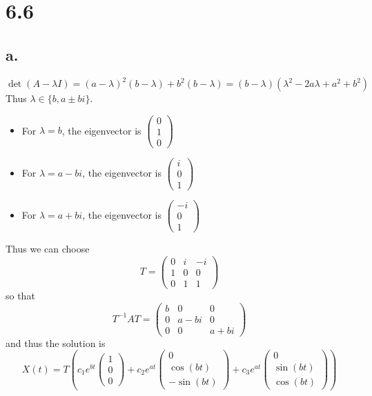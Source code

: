 \documentclass[11pt]{article}
\theoremstyle{mystyle}
\theoremstyle{definition}
\begin{document}
\section*{6.6}
\subsection*{a.}
\[
  \det(A-\lambda I) = (a-\lambda)^2(b-\lambda) + b^2(b-\lambda) = (b-\lambda)(\lambda^2 - 2a\lambda + a^2 + b^2)
\]
Thus $\lambda \in \{b, a \pm bi\}$. \\
\begin{itemize}
  \item For $\lambda = b$, the eigenvector is
    $  
    \begin{pmatrix}
      0 \\ 1 \\ 0 
    \end{pmatrix}
    $ 
  \item For $\lambda = a-bi$, the eigenvector is
    $  
    \begin{pmatrix}
      i \\ 0 \\ 1 
    \end{pmatrix}
    $
  \item For $\lambda = a+bi$, the eigenvector is
    $  
    \begin{pmatrix}
      -i \\ 0 \\ 1 
    \end{pmatrix}
    $
\end{itemize}
Thus we can choose 
\[
  T = 
  \begin{pmatrix}
    0 & i & -i \\
    1 & 0 & 0 \\
    0 & 1 & 1
  \end{pmatrix}
\]
so that 
\[
  T^{-1}AT = 
  \begin{pmatrix}
    b & 0 & 0 \\
    0 & a-bi & 0 \\
    0 & 0 & a+bi
  \end{pmatrix}
\]
and thus the solution is 
\[
  X(t) = T \left(
  c_1 e^{bt} 
  \begin{pmatrix}
    1 \\ 0 \\ 0
  \end{pmatrix}
  + c_2 e^{at} 
  \begin{pmatrix}
    0 \\ \cos(bt) \\ -\sin(bt)
  \end{pmatrix}
  + c_3 e^{at}
  \begin{pmatrix}
    0 \\ \sin(bt) \\ \cos(bt)
  \end{pmatrix}
  \right)
\]
\end{document}
